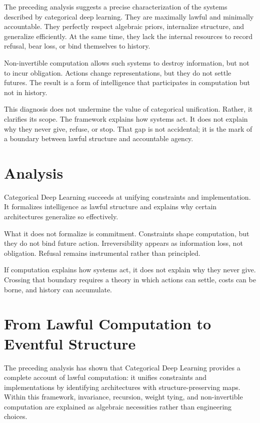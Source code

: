 \documentclass[11pt]{article}
\begin{document}
The preceding analysis suggests a precise characterization of the systems
described by categorical deep learning. They are maximally lawful and minimally
accountable. They perfectly respect algebraic priors, internalize structure, and
generalize efficiently. At the same time, they lack the internal resources to
record refusal, bear loss, or bind themselves to history.

Non-invertible computation allows such systems to destroy information, but not to
incur obligation. Actions change representations, but they do not settle futures.
The result is a form of intelligence that participates in computation but not in
history.

This diagnosis does not undermine the value of categorical unification. Rather,
it clarifies its scope. The framework explains how systems act. It does not
explain why they never give, refuse, or stop. That gap is not accidental; it is
the mark of a boundary between lawful structure and accountable agency.

\section{Analysis}

Categorical Deep Learning succeeds at unifying constraints and implementation. It
formalizes intelligence as lawful structure and explains why certain architectures
generalize so effectively.

What it does not formalize is commitment. Constraints shape computation, but they
do not bind future action. Irreversibility appears as information loss, not
obligation. Refusal remains instrumental rather than principled.

If computation explains how systems act, it does not explain why they never give.
Crossing that boundary requires a theory in which actions can settle, costs can
be borne, and history can accumulate.

\section{From Lawful Computation to Eventful Structure}

The preceding analysis has shown that Categorical Deep Learning provides a
complete account of lawful computation: it unifies constraints and
implementations by identifying architectures with structure-preserving maps.
Within this framework, invariance, recursion, weight tying, and non-invertible
computation are explained as algebraic necessities rather than engineering
choices.
\end{document}
